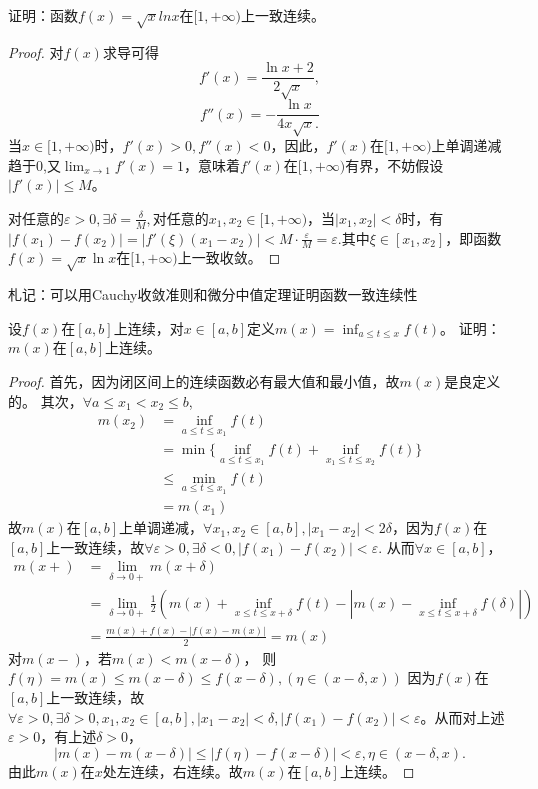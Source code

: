   \begin{example}
  证明：函数$f(x)=\sqrt{x}lnx$在$[1,+\infty)$上一致连续。%
  \end{example}

  \begin{proof}
  对$f(x)$求导可得
  \[f'(x)=\frac{\ln x+2}{2\sqrt x},\]
  \[f''(x)=-\frac{\ln x}{4x\sqrt x.}\]
  当$x\in[1,+\infty)$时，$f'(x)>0,f''(x)<0$，因此，$f'(x)$在$[1,+\infty)$上单调递减趋于0,又$\lim_{x\rightarrow1}f'(x)=1$，意味着$f'(x)$在$[1,+\infty)$有界，不妨假设$|f'(x)|\leq M$。
  
  对任意的$\varepsilon>0,\exists\delta=\frac{\delta}M,$对任意的$x_1,x_2\in[1,+\infty)$，当$|x_1,x_2|<\delta$时，有$|f(x_1)-f(x_2)|=|f'(\xi)(x_1-x_2)|<M\cdot\frac{\varepsilon}{M}=\varepsilon.$其中$\xi\in[x_1,x_2]$，即函数$f(x)=\sqrt{x}\ln x$在$[1,+\infty)$上一致收敛。
  \end{proof}

\begin{remark}
  札记：可以用Cauchy收敛准则和微分中值定理证明函数一致连续性
\end{remark}

\begin{example}
  设$f(x)$在$[a,b]$上连续，对$x\in[a,b]$定义$\displaystyle m(x)=\inf_{a\leq t\leq x}f(t)$。
  证明：$m(x)$在$[a,b]$上连续。%
  \end{example}

  \begin{proof}  
  首先，因为闭区间上的连续函数必有最大值和最小值，故$m(x)$是良定义的。
  其次，$\forall a\leq x_1<x_2\leq b$,
  \begin{align*}
  m(x_2)&=\inf_{a\leq t\leq x_1}f(t)\\
  &=\min\{\inf_{a\leq t\leq x_1}f(t)+\inf_{x_1\leq t\leq x_2}f(t)\}\\
  &\leq\min_{a\leq t\leq x_1}f(t)\\
  &=m(x_1)
  \end{align*}
  故$m(x)$在$[a,b]$上单调递减，$\forall x_1,x_2\in[a,b],|x_1-x_2|<2\delta$，因为$f(x)$在$[a,b]$上一致连续，故$\forall\varepsilon>0,\exists\delta<0,|f(x_1)-f(x_2)|<\varepsilon.$ 从而$\forall x\in[a,b]$，
  \begin{align*}
  m(x+)&=\lim_{\delta\rightarrow0+}m(x+\delta)\\
  &=\lim_{\delta\rightarrow0+}\frac{1}{2}(m(x)+\inf_{x\leq t\leq x+\delta}f(t)-|m(x)-\inf_{x\leq t\leq x+\delta}f(\delta)|)\\
  &=\frac{m(x)+f(x)-|f(x)-m(x)|}{2} 
  =m(x)
  \end{align*}
  对$m(x-)$，若$m(x)<m(x-\delta)$，
  则$f(\eta)=m(x)\leq m(x-\delta)\leq f(x-\delta),(\eta\in(x-\delta,x))$
  因为$f(x)$在$[a,b]$上一致连续，故$\forall\varepsilon>0,\exists\delta>0,x_1,x_2\in[a,b],|x_1-x_2|<\delta,|f(x_1)-f(x_2)|<\varepsilon$。从而对上述$\varepsilon>0$，有上述$\delta>0$，$$|m(x)-m(x-\delta)|\leq|f(\eta)-f(x-\delta)|<\varepsilon, \eta\in(x-\delta,x).$$
  由此$m(x)$在$x$处左连续，右连续。故$m(x)$在$[a,b]$上连续。
  \end{proof}
  
